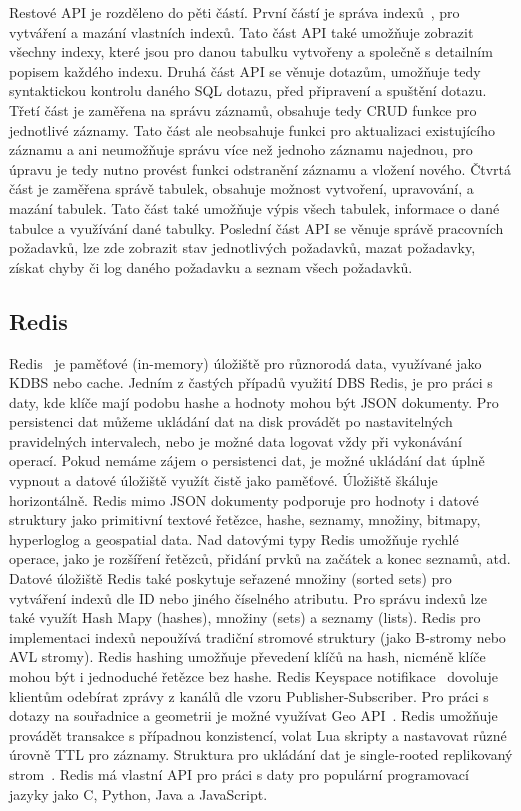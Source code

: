 \documentclass[czech,master,dept460,male,csharp,cpdeclaration]{diploma}
\begin{document}
	Restové API je rozděleno do pěti částí. První částí je správa indexů~\cite{index}, pro vytváření a mazání vlastních indexů. Tato část API také umožňuje zobrazit všechny indexy, které jsou pro danou tabulku vytvořeny a společně s detailním popisem každého indexu. Druhá část API se věnuje dotazům, umožňuje tedy syntaktickou kontrolu daného SQL dotazu, před připravení a spuštění dotazu. Třetí část je zaměřena na správu záznamů, obsahuje tedy CRUD funkce pro jednotlivé záznamy. Tato část ale neobsahuje funkci pro aktualizaci existujícího záznamu a ani neumožňuje správu více než jednoho záznamu najednou, pro úpravu je tedy nutno provést funkci odstranění záznamu a vložení nového. Čtvrtá část je zaměřena správě tabulek, obsahuje možnost vytvoření, upravování, a mazání tabulek. Tato část také umožňuje výpis všech tabulek, informace o dané tabulce a využívání dané tabulky. Poslední část API se věnuje správě pracovních požadavků, lze zde zobrazit stav jednotlivých požadavků, mazat požadavky, získat chyby či log daného požadavku a seznam všech požadavků.
		
	\subsection{Redis} \label{lab-redis}
	
	Redis~\cite{redis} je paměťové (in-memory) úložiště pro různorodá data, využívané jako KDBS nebo cache. Jedním z častých případů využití DBS Redis, je pro práci s daty, kde klíče mají podobu hashe a hodnoty mohou být JSON dokumenty. Pro persistenci dat můžeme ukládání dat na disk provádět po nastavitelných pravidelných intervalech, nebo je možné data logovat vždy při vykonávání operací. Pokud nemáme zájem o persistenci dat, je možné ukládání dat úplně vypnout a datové úložiště využít čistě jako paměťové. Úložiště škáluje horizontálně. Redis mimo JSON dokumenty podporuje pro hodnoty i datové struktury jako primitivní textové řetězce, hashe, seznamy, množiny, bitmapy, hyperloglog a geospatial data. Nad datovými typy Redis umožňuje rychlé operace, jako je rozšíření řetězců, přidání prvků na začátek a konec seznamů, atd. Datové úložiště Redis také poskytuje seřazené množiny (sorted sets) pro vytváření indexů dle ID nebo jiného číselného atributu. Pro správu indexů lze také využít Hash Mapy (hashes), množiny (sets) a seznamy (lists). Redis pro implementaci indexů nepoužívá tradiční stromové struktury (jako B-stromy nebo AVL stromy). Redis hashing umožňuje převedení klíčů na hash, nicméně klíče mohou být i jednoduché řetězce bez hashe. Redis Keyspace notifikace~\cite{redis-keyspace-not} dovoluje klientům odebírat zprávy z kanálů dle vzoru Publisher-Subscriber. Pro práci s dotazy na souřadnice a geometrii je možné využívat Geo API~\cite{redis-geospatial}. Redis umožňuje provádět transakce s případnou konzistencí, volat Lua skripty a nastavovat různé úrovně TTL pro záznamy. Struktura pro ukládání dat je single-rooted replikovaný strom~\cite{tree-replic}. Redis má vlastní API pro práci s daty pro populární programovací jazyky jako C, Python, Java a JavaScript.
	
\end{document}
